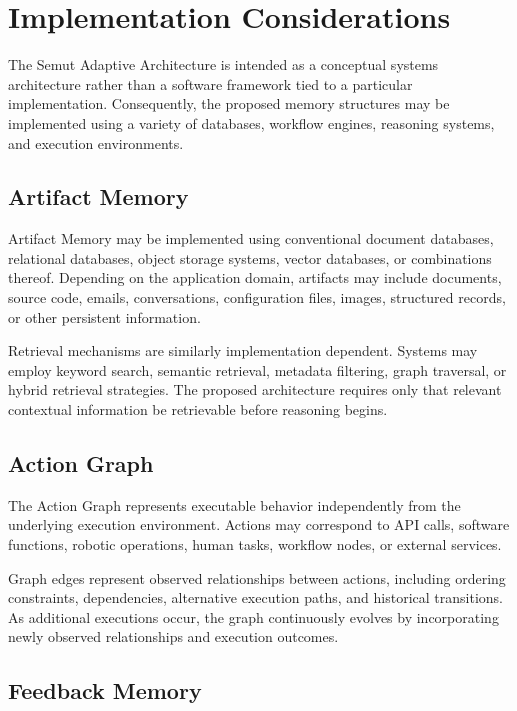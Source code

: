 \section{Implementation Considerations}
\label{sec:implementation}

The Semut Adaptive Architecture is intended as a conceptual systems architecture rather than a software framework tied to a particular implementation. Consequently, the proposed memory structures may be implemented using a variety of databases, workflow engines, reasoning systems, and execution environments.

\subsection{Artifact Memory}

Artifact Memory may be implemented using conventional document databases, relational databases, object storage systems, vector databases, or combinations thereof. Depending on the application domain, artifacts may include documents, source code, emails, conversations, configuration files, images, structured records, or other persistent information.

Retrieval mechanisms are similarly implementation dependent. Systems may employ keyword search, semantic retrieval, metadata filtering, graph traversal, or hybrid retrieval strategies. The proposed architecture requires only that relevant contextual information be retrievable before reasoning begins.

\subsection{Action Graph}

The Action Graph represents executable behavior independently from the underlying execution environment. Actions may correspond to API calls, software functions, robotic operations, human tasks, workflow nodes, or external services.

Graph edges represent observed relationships between actions, including ordering constraints, dependencies, alternative execution paths, and historical transitions. As additional executions occur, the graph continuously evolves by incorporating newly observed relationships and execution outcomes.

\subsection{Feedback Memory}

